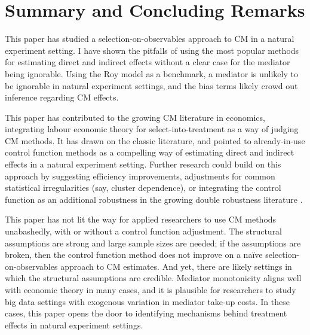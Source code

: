 \section{Summary and Concluding Remarks}
\label{sec:conclusion}

This paper has studied a selection-on-observables approach to CM in a natural experiment setting.
I have shown the pitfalls of using the most popular methods for estimating direct and indirect effects without a clear case for the mediator being ignorable.
Using the Roy model as a benchmark, a mediator is unlikely to be ignorable in natural experiment settings, and the bias terms likely crowd out inference regarding CM effects.

This paper has contributed to the growing CM literature in economics, integrating labour economic theory for select-into-treatment as a way of judging CM methods.
It has drawn on the classic literature, and pointed to already-in-use control function methods as a compelling way of estimating direct and indirect effects in a natural experiment setting.
Further research could build on this approach by suggesting efficiency improvements, adjustments for common statistical irregularities (say, cluster dependence), or integrating the control function as an additional robustness in the growing double robustness literature \citep{huber2019review,bia2024double}.

This paper has not lit the way for applied researchers to use CM methods unabashedly, with or without a control function adjustment.
The structural assumptions are strong and large sample sizes are needed; if the assumptions are broken, then the control function method does not improve on a na\"ive selection-on-observables approach to CM estimates.
And yet, there are likely settings in which the structural assumptions are credible.
Mediator monotonicity aligns well with economic theory in many cases, and it is plausible for researchers to study big data settings with exogenous variation in mediator take-up costs.
In these cases, this paper opens the door to identifying mechanisms behind treatment effects in natural experiment settings.
